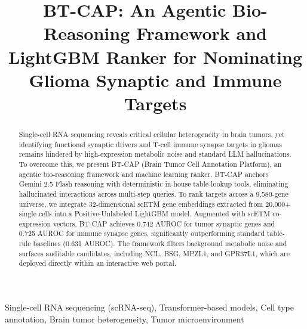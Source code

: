\documentclass[conference]{IEEEtran}
\begin{document}
\title{BT-CAP: An Agentic Bio-Reasoning Framework and LightGBM Ranker for Nominating Glioma Synaptic and Immune Targets
\\}

\author{
\and
{}
}

\maketitle

\begin{abstract}
Single-cell RNA sequencing reveals critical cellular heterogeneity in brain tumors, yet identifying functional synaptic drivers and T-cell immune synapse targets in gliomas remains hindered by high-expression metabolic noise and standard LLM hallucinations. To overcome this, we present BT-CAP (Brain Tumor Cell Annotation Platform), an agentic bio-reasoning framework and machine learning ranker. BT-CAP anchors Gemini 2.5 Flash reasoning with deterministic in-house table-lookup tools, eliminating hallucinated interactions across multi-step queries. To rank targets across a 9,580-gene universe, we integrate 32-dimensional scETM gene embeddings extracted from 20,000+ single cells into a Positive-Unlabeled LightGBM model. Augmented with scETM co-expression vectors, BT-CAP achieves 0.742 AUROC for tumor synaptic genes and 0.725 AUROC for immune synapse genes, significantly outperforming standard table-rule baselines (0.631 AUROC). The framework filters background metabolic noise and surfaces auditable candidates, including NCL, BSG, MPZL1, and GPR37L1, which are deployed directly within an interactive web portal.
\end{abstract}

\begin{IEEEkeywords}
Single-cell RNA sequencing (scRNA-seq), Transformer-based models, Cell type annotation, Brain tumor heterogeneity, Tumor microenvironment
\end{IEEEkeywords}
\end{document}
